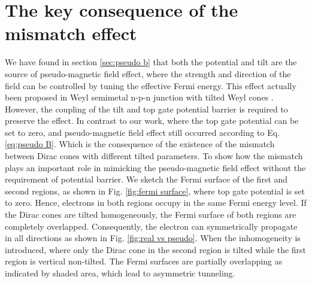 \section{The key consequence of the mismatch effect}
    We have found in section \ref{sec:pseudo b} that both the potential and tilt are the source of pseudo-magnetic field effect, where the strength and direction of the field can be controlled by tuning the effective Fermi energy.
    This effect actually been proposed in Weyl semimetal n-p-n junction with tilted Weyl cones \cite{Yesilyurt2017a}.
    However, the coupling of the tilt and top gate potential barrier is required to preserve the effect. In contrast to our work, where the top gate potential can be set to zero, and pseudo-magnetic field effect still occurred according to Eq. \ref{eq:pseudo B}.
    Which is the consequence of the existence of the mismatch between Dirac cones with different tilted parameters. 
    To show how the mismatch plays an important role in mimicking the pseudo-magnetic field effect without the requirement of potential barrier. 
    We sketch the Fermi surface of the first and second regions, as shown in Fig. \ref{fig:fermi surface}, where top gate potential is set to zero. 
    Hence, electrons in both regions occupy in the same Fermi energy level. 
    If the Dirac cones are tilted homogeneously, the Fermi surface of both regions are completely overlapped. 
    Consequently, the electron can symmetrically propagate in all directions as shown in Fig. \ref{fig:real vs pseudo}. 
    When the inhomogeneity is introduced, where only the Dirac cone in the second region is tilted while the first region is vertical non-tilted. 
    The Fermi surfaces are partially overlapping as indicated by shaded area, which lead to asymmetric tunneling.
    
